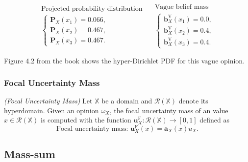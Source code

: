 \def\arraystretch{1}
\begin{equation}
    \begin{array}{l}
        \text{Projected probability distribution} \\
        \left\{\begin{array}{l}
            \mathbf{P}_X(x_1) = 0.066 \text{,} \\
            \mathbf{P}_X(x_2) = 0.467 \text{,} \\
            \mathbf{P}_X(x_3) = 0.467 \text{.}
        \end{array}\right.
    \end{array} \quad
    \begin{array}{l}
        \text{Vague belief mass} \\
        \left\{\begin{array}{l}
            \mathbf{b}^{\mathrm{V}}_X(x_1) = 0.0 \text{,} \\
            \mathbf{b}^{\mathrm{V}}_X(x_2) = 0.4 \text{,} \\
            \mathbf{b}^{\mathrm{V}}_X(x_3) = 0.4 \text{.}
        \end{array}\right.
    \end{array}
\end{equation}

Figure 4.2 from the book shows the hyper-Dirichlet PDF for this vague opinion.

\subsubsection{Focal Uncertainty Mass}

\begin{definition}
    \emph{(Focal Uncertainty Mass)} Let $\mathbb{X}$ be a domain and $\mathcal{R}(\mathbb{X})$ denote its
hyperdomain. Given an opinion $\omega_X$, the focal uncertainty mass of an value $x \in \mathcal{R}(\mathbb{X})$
is computed with the function $\mathbf{u}^{\mathrm{F}}_X : \mathcal{R}(\mathbb{X}) \rightarrow [0, 1]$ defined as
    \begin{equation}
        \text{Focal uncertainty mass: } \mathbf{u}^{\mathrm{F}}_X(x) = \mathbf{a}_X(x) u_X \text{.}
    \end{equation}
\end{definition}

\subsection{Mass-sum}

